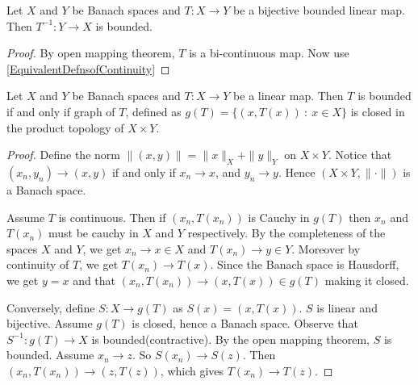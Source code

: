\begin{corollary}
  Let $X$ and $Y$ be Banach spaces and $T: X \to Y$ be a bijective
  bounded linear map. Then $T^{-1}: Y \to X$ is bounded.
\end{corollary}
\begin{proof}
  By open mapping theorem, $T$ is a bi-continuous map. Now use
  \autoref{EquivalentDefnsofContinuity}
\end{proof}

\begin{theorem}
  Let $X$ and $Y$ be Banach spaces and $T: X \to Y$ be a linear map.
  Then $T$ is bounded if and only if graph of $T$, defined as $g(T) =
  \{ (x, T(x)) \ : \ x \in X \}$ is closed in the product topology of
  $ X \times Y$.
\end{theorem}
\begin{proof}
  Define the norm $\|(x, y)\| = \|x\|_X + \|y\|_Y$ on $X \times Y$.
  Notice that $(x_n, y_n) \to (x, y)$ if and only if $x_n \to x$, and
  $y_n \to y$. Hence $(X \times Y, \|\cdot\|)$ is a Banach space.

  Assume $T$ is continuous. Then if $(x_n, T(x_n))$ is Cauchy in
  $g(T)$ then $x_n$ and $T(x_n)$ must be cauchy in $X$ and $Y$
  respectively. By the completeness of the spaces $X$ and $Y$, we get
  $x_n \to x \in X$ and $T( x_n) \to y \in Y$. Moreover by continuity
  of $T$, we get $T(x_n) \to T(x)$. Since the Banach space is Hausdorff,
  we get $y = x$ and that $(x_n, T(x_n)) \to (x, T(x)) \in g(T)$
  making it closed.

  Conversely,  define $S: X \to g(T)$ as $S(x) = (x, T(x))$. $S$ is
  linear and bijective. Assume $ g(T)$ is closed, hence a Banach space.
  Observe that $S^{-1}: g(T) \to X$ is bounded(contractive). By the
  open mapping theorem, $S$ is bounded. Assume $x_n \to z$. So
  $S(x_n) \to S(z)$. Then $(x_n, T(x_n)) \to (z, T(z))$, which gives
  $  T(x_n ) \to T(z)$.
\end{proof}
